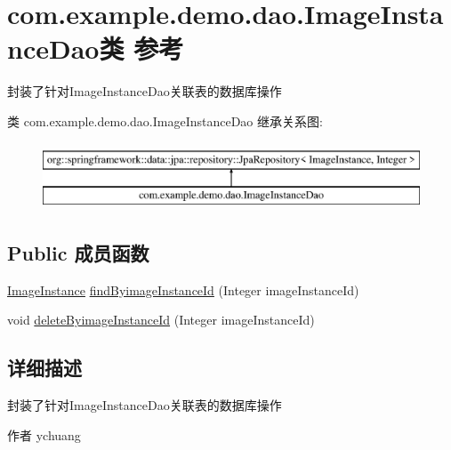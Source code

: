 \hypertarget{interfacecom_1_1example_1_1demo_1_1dao_1_1_image_instance_dao}{}\section{com.\+example.\+demo.\+dao.\+Image\+Instance\+Dao类 参考}
\label{interfacecom_1_1example_1_1demo_1_1dao_1_1_image_instance_dao}


封装了针对\+Image\+Instance\+Dao关联表的数据库操作  


类 com.\+example.\+demo.\+dao.\+Image\+Instance\+Dao 继承关系图\+:\begin{figure}[H]
\begin{center}
\leavevmode
\includegraphics[height=2.000000cm]{interfacecom_1_1example_1_1demo_1_1dao_1_1_image_instance_dao}
\end{center}
\end{figure}
\subsection*{Public 成员函数}
\begin{DoxyCompactItemize}
\item 
\mbox{\hyperlink{classcom_1_1example_1_1demo_1_1modular_1_1_image_instance}{Image\+Instance}} \mbox{\hyperlink{interfacecom_1_1example_1_1demo_1_1dao_1_1_image_instance_dao_a3186e8a636d9384dece6db307275fa42}{find\+Byimage\+Instance\+Id}} (Integer image\+Instance\+Id)
\item 
void \mbox{\hyperlink{interfacecom_1_1example_1_1demo_1_1dao_1_1_image_instance_dao_a39ca626c2213108e8772584ddb6b25a1}{delete\+Byimage\+Instance\+Id}} (Integer image\+Instance\+Id)
\end{DoxyCompactItemize}


\subsection{详细描述}
封装了针对\+Image\+Instance\+Dao关联表的数据库操作 

\begin{DoxyAuthor}{作者}
ychuang 
\end{DoxyAuthor}


